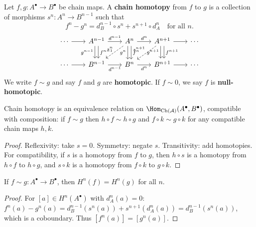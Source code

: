 \begin{definition}\label{def:chain-homotopy}
Let $f, g \colon A^\bullet \to B^\bullet$ be chain maps. A \textbf{chain homotopy}
from $f$ to $g$ is a collection of morphisms $s^n \colon A^n \to B^{n-1}$ such that
\[
    f^n - g^n = d_B^{n-1} \circ s^n + s^{n+1} \circ d_A^n \quad \text{for all } n.
\]
\[
\begin{tikzcd}[column sep=2em]
    \cdots \arrow[r] & A^{n-1} \arrow[r, "d^{n-1}"] \arrow[d, shift left=1, "f^{n-1}"]
    \arrow[d, shift right=1, "g^{n-1}"']
    & A^n \arrow[r, "d^n"] \arrow[d, shift left=1, "f^n"]
    \arrow[d, shift right=1, "g^n"'] \arrow[ld, dashed, "s^n"']
    & A^{n+1} \arrow[r] \arrow[d, shift left=1, "f^{n+1}"]
    \arrow[d, shift right=1, "g^{n+1}"'] \arrow[ld, dashed, "s^{n+1}"']
    & \cdots \\
    \cdots \arrow[r] & B^{n-1} \arrow[r, "d^{n-1}"'] & B^n \arrow[r, "d^n"'] & B^{n+1} \arrow[r] & \cdots
\end{tikzcd}
\]
We write $f \sim g$ and say $f$ and $g$ are \textbf{homotopic}.
If $f \sim 0$, we say $f$ is \textbf{null-homotopic}.
\end{definition}

\begin{proposition}\label{prop:homotopy-equiv-rel}
Chain homotopy is an equivalence relation on $\Hom_{\operatorname{Ch}(\mathcal{A})}(A^\bullet, B^\bullet)$,
compatible with composition: if $f \sim g$ then $h \circ f \sim h \circ g$ and
$f \circ k \sim g \circ k$ for any compatible chain maps $h, k$.
\end{proposition}

\begin{proof}
Reflexivity: take $s = 0$. Symmetry: negate $s$. Transitivity: add homotopies.
For compatibility, if $s$ is a homotopy from $f$ to $g$, then $h \circ s$ is a homotopy
from $h \circ f$ to $h \circ g$, and $s \circ k$ is a homotopy from $f \circ k$ to $g \circ k$.
\end{proof}

\begin{proposition}\label{prop:homotopic-cohomology}
If $f \sim g \colon A^\bullet \to B^\bullet$, then $H^n(f) = H^n(g)$ for all $n$.
\end{proposition}

\begin{proof}
For $[a] \in H^n(A^\bullet)$ with $d_A^n(a) = 0$:
$f^n(a) - g^n(a) = d_B^{n-1}(s^n(a)) + s^{n+1}(d_A^n(a)) = d_B^{n-1}(s^n(a))$,
which is a coboundary. Thus $[f^n(a)] = [g^n(a)]$.
\end{proof}

